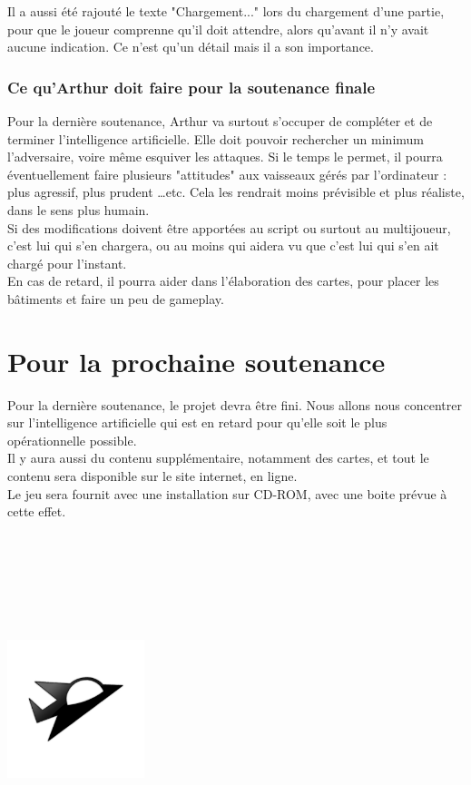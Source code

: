 \documentclass[10pt, titlepage]{report}
\begin{document}
Il a aussi été rajouté le texte "Chargement..." lors du chargement d'une partie, pour que le joueur comprenne qu'il doit attendre, alors qu'avant il n'y avait aucune indication. Ce n'est qu'un détail mais il a son importance.\\

\subsection{Ce qu'Arthur doit faire pour la soutenance finale}
Pour la dernière soutenance, Arthur va surtout s'occuper de compléter et de terminer l'intelligence artificielle. Elle doit pouvoir rechercher un minimum l'adversaire, voire même esquiver les attaques. Si le temps le permet, il pourra éventuellement faire plusieurs "attitudes" aux vaisseaux gérés par l'ordinateur : plus agressif, plus prudent \dots  etc. Cela les rendrait moins prévisible et plus réaliste, dans le sens plus humain.\\

Si des modifications doivent être apportées au script ou surtout au multijoueur, c'est lui qui s'en chargera, ou au moins qui aidera vu que c'est lui qui s'en ait chargé pour l'instant.\\

En cas de retard, il pourra aider dans l'élaboration des cartes, pour placer les bâtiments et faire un peu de gameplay.

\chapter{Pour la prochaine soutenance}
Pour la dernière soutenance, le projet devra être fini. Nous allons nous concentrer sur l'intelligence artificielle qui est en retard pour qu'elle soit le plus opérationnelle possible.\\

Il y aura aussi du contenu supplémentaire, notamment des cartes, et tout le contenu sera disponible sur le site internet, en ligne.\\

Le jeu sera fournit avec une installation sur CD-ROM, avec une boite prévue à cette effet.\\ \\ \\ \\ \\ \\ \\

\begin{center}
\includegraphics[height=4cm, width=4cm]{vaisseux_petit.png}
\end{center}
\end{document}
